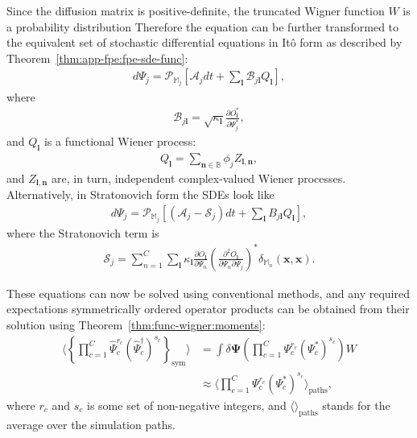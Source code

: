 \documentclass[12pt,aip,jmp,amssymb,amsmath]{revtex4-1}
\newcommand{\lvec}{\boldsymbol{l}}
\newcommand{\nvec}{\boldsymbol{n}}
\newcommand{\xvec}{\boldsymbol{x}}
\newcommand{\bPsi}{\boldsymbol{\Psi}}
\newcommand{\symprod}[1]{\left\{ #1 \right\}_{\mathrm{sym}}}
\newcommand{\pathavg}[1]{\langle #1 \rangle_{\mathrm{paths}}}
\newcommand{\Psiop}{\hat{\Psi}}
\newcommand{\fullbasis}{\mathbb{B}}
\newcommand{\restbasis}{\mathbb{M}}
\newcommand{\thmref}[1]{Theorem~\ref{thm:#1}}
\begin{document}
Since the diffusion matrix is positive-definite, the truncated Wigner function $W$ is a probability distribution
Therefore the equation can be further transformed to the equivalent set of stochastic differential equations in It\^{o} form as described by \thmref{app-fpe:fpe-sde-func}:
\begin{equation}\begin{split}
\label{eqn:fpe:sdes}
    d\Psi_j = \mathcal{P}_{\restbasis_j} \left[
        \mathcal{A}_j dt + \sum_{\lvec} \mathcal{B}_{j \lvec} Q_{\lvec}
    \right],
\end{split}\end{equation}
where
\begin{equation}\begin{split}
    \mathcal{B}_{j \lvec} = \sqrt{\kappa_{\lvec}} \frac{\partial O_{\lvec}^*}{\partial \Psi_j^*},
\end{split}\end{equation}
and $Q_{\lvec}$ is a functional Wiener process:
\begin{equation}\begin{split}
    Q_{\lvec} = \sum_{\nvec \in \fullbasis} \phi_j Z_{\lvec,\nvec},
\end{split}\end{equation}
and $Z_{\lvec,\nvec}$ are, in turn, independent complex-valued Wiener processes.
Alternatively, in Stratonovich form the SDEs look like
\begin{equation}\begin{split}
    d\Psi_j = \mathcal{P}_{\restbasis_j} \left[
        (\mathcal{A}_j - \mathcal{S}_j) dt + \sum_{\lvec} B_{j \lvec} Q_{\lvec}
    \right],
\end{split}\end{equation}
where the Stratonovich term is
\begin{equation}\begin{split}
    \mathcal{S}_j
    = \sum_{n=1}^C \sum_{\lvec} \kappa_{\lvec}
        \frac{\partial O_{\lvec}}{\partial \Psi_n}
        \left(\frac{\partial^2 O_{\lvec}}{\partial \Psi_n \partial \Psi_j} \right)^*
        \delta_{\restbasis_n} (\xvec, \xvec).
\end{split}\end{equation}

These equations can now be solved using conventional methods, and any required expectations symmetrically ordered operator products can be obtained from their solution using \thmref{func-wigner:moments}:
\begin{equation}\begin{split}
    \langle \symprod{
        \prod_{c=1}^C \Psiop_c^{r_c} (\Psiop_c^\dagger)^{s_c}
    } \rangle
    & = \int \delta \bPsi \left(
            \prod_{c=1}^C \Psi_c^{r_c} (\Psi_c^*)^{s_c}
        \right) W \\
    & \approx \pathavg{
        \prod_{c=1}^C \Psi_c^{r_c} (\Psi_c^*)^{s_c}
    },
\end{split}\end{equation}
where $r_c$ and $s_c$ is some set of non-negative integers, and $\pathavg{}$ stands for the average over the simulation paths.
\end{document}
